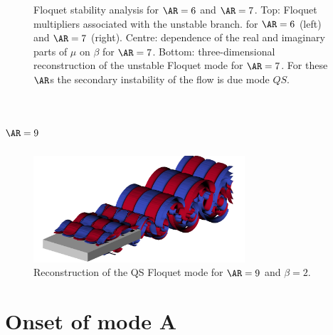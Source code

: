 \documentclass{jfm}
\begin{document}
\begin{figure}
  \caption{Floquet stability analysis for $\AR=6$ and $\AR=7$. Top: Floquet multipliers associated with the unstable branch. for $\AR=6$ (left) and $\AR=7$ (right). Centre: dependence of the real and imaginary parts of $\mu$ on $\beta$ for $\AR=7$. Bottom: three-dimensional reconstruction of the unstable Floquet mode for $\AR=7$. For these $\AR$s the secondary instability of the flow is due mode $QS$.}
  \label{fig:mult_AR7s}
\end{figure}

\section{$\AR=9$}

\begin{figure}
  \centering
  \includegraphics[width=0.7\textwidth]{./fig/AR9s/Floquet_AR9_Re450_beta2_modeQS.png}
  \caption{Reconstruction of the QS Floquet mode for $\AR=9$ and $\beta=2$.}
  \label{fig:mult_AR9s}
\end{figure}

\section{Onset of mode A}
\end{document}
